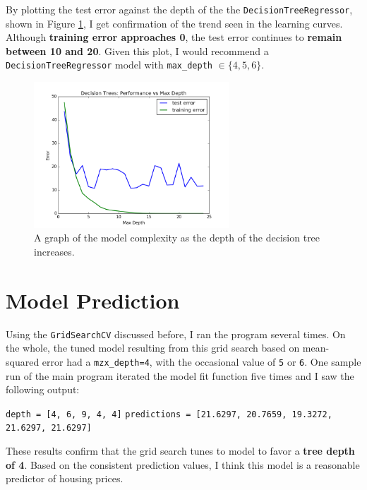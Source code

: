 \documentclass[12pt,letterpaper]{article}
\begin{document}
By plotting the test error against the depth of the the \verb|DecisionTreeRegressor|, shown in Figure \ref{fig:mc}, I get confirmation of the trend seen in the learning curves.
Although {\bf training error approaches 0}, the test error continues to {\bf remain between 10 and 20}.
Given this plot, I would recommend a \verb|DecisionTreeRegressor| model with \verb|max_depth| $\in \{4,5,6\}$.

\begin{figure}[h!]
	\centering
	\includegraphics[width=0.65\textwidth]{model-complexity.png}
	\caption{A graph of the model complexity as the depth of the decision tree increases.}
	\label{fig:mc}
\end{figure}

\section*{Model Prediction}

Using the \verb|GridSearchCV| discussed before, I ran the program several times.
On the whole, the tuned model resulting from this grid search based on mean-squared error had a \verb|mzx_depth=4|, with the occasional value of \verb|5| or \verb|6|.
One sample run of the main program iterated the model fit function five times and I saw the following output:
\begin{center}
	\verb|depth = [4, 6, 9, 4, 4]|
	\verb|predictions = [21.6297, 20.7659, 19.3272, 21.6297, 21.6297]|
\end{center}
These results confirm that the grid search tunes to model to favor a {\bf tree depth of 4}.
Based on the consistent prediction values, I think this model is a reasonable predictor of housing prices.
\end{document}
